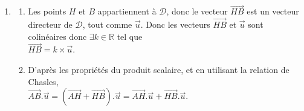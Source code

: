 \documentclass[10pt]{article}
\providecommand{\R}{\mathbb{R}}
\providecommand{\vect}[1]{\overrightarrow{#1}}
\begin{document}
\begin{enumerate}
\begin{enumerate}
En prenant comme vecteur normal à $\mathcal{P}$ le vecteur $\vect{u}$, on obtient : $\mathcal{P}~:$

$2x-y+2z+d=0$. Or $A\in \mathcal{P}$ donc $-2-1+6+d=0$ donc $d=-3$. Donc $\mathcal{P}$ a pour équation $2x-y+2z-3=0$
		\item Le projeté orthogonal de $A$ sur la droite $\mathcal{D}$, noté $H$, est l'unique point d'intersection de $\mathcal{P}$ et $\mathcal{D}$. Résolvons donc le système suivant : \\
	$\left\{\begin{array}{l c l} 2x-y + 2z-3&=&0\\x&=&1+2t\\y &=& 2 - t\\z&=& 2+2t \end{array}\right.$. On remplace $x$, $y$ et $z$ dans la première équation :\\
	$2x-y+2z-3=0\iff 2(1 + 2t)-(2 - t)+2(2 + 2t) - 3 = 0 \iff $
	
$2 + 4t  - 2 + t + 4 + 4t = 0 \iff 9t + 1= 0\iff t = -\dfrac{1}{9}$.\\
	On remplace la valeur de $t$ dans les trois dernières équations :\\
		$\left\{\begin{array}{l c l} x&=&1+2\times-\dfrac{1}{9}=\dfrac{7}{9} \\y &=& 2 - \left(-\dfrac{1}{9}\right)=\dfrac{19}{9}\\z&=& 2+2 \times \left(-\dfrac{1}{9}\right) =\dfrac{16}{9} \end{array}\right.$. Donc $H\left(\dfrac79~;~\dfrac{19}{9}~;~\dfrac{16}{9}\right)$.
		\item Déterminons les coordonnées de $\vect{AH}$ avec $A(-1~;~1~;~3)$ et $H\left(\dfrac79~;~\dfrac{19}{9}~;~\dfrac{16}{9}\right)$ : \(\overrightarrow{AH}\begin{pmatrix}\frac{16}{9}\\\frac{10}{9}\\-\frac{11}{9}\end{pmatrix}\).

Donc $\left\| \vect{AH}\right\| =\sqrt{\left(\dfrac{16}{9}\right)^2+\left(\dfrac{10}{9}\right)^2+\left(-\dfrac{11}{9}\right)^2}=\dfrac{\sqrt{477}}{9}=\dfrac{\sqrt{53}}{3}$
\end{enumerate}
\item 
\begin{enumerate}
	\item Les points $H$ et $B$ appartiennent à $\mathcal{D}$, donc le vecteur $\vect{HB}$ est un vecteur directeur de $\mathcal{D}$, tout comme $\vect{u}$. Donc les vecteurs $\vect{HB}$ et $\vect{u}$ sont colinéaires donc $\exists k \in \R$ tel que \\$\vect{HB}=k\times \vect{u}$.
	\item D'après les propriétés du produit scalaire, et en utilisant la relation de Chasles, \\ $\vect{AB}.\vect{u}=\left(\vect{AH}+\vect{HB}\right).\vect{u}=\vect{AH}.\vect{u}+ \vect{HB}.\vect{u}$.
	

\end{enumerate}
\end{enumerate}
\end{document}
